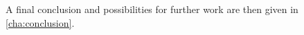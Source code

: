 A final conclusion and possibilities for further work are then given in \cref{cha:conclusion}.






